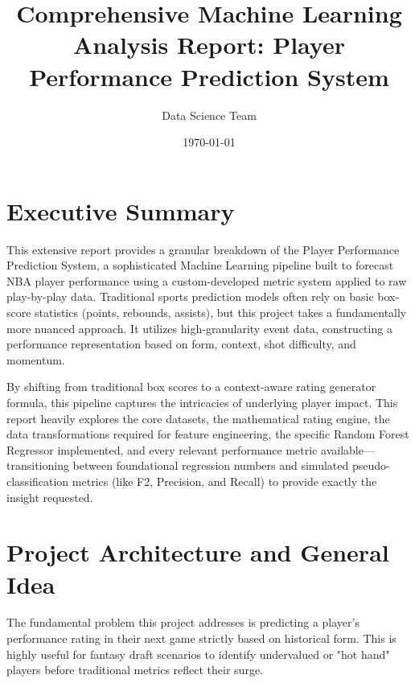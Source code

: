 \documentclass[12pt,a4paper]{article}
\title{\textbf{Comprehensive Machine Learning Analysis Report: Player Performance Prediction System}}
\author{Data Science Team}
\date{\today}
\begin{document}
\maketitle
\tableofcontents
\newpage

\section{Executive Summary}
This extensive report provides a granular breakdown of the Player Performance Prediction System, a sophisticated Machine Learning pipeline built to forecast NBA player performance using a custom-developed metric system applied to raw play-by-play data. Traditional sports prediction models often rely on basic box-score statistics (points, rebounds, assists), but this project takes a fundamentally more nuanced approach. It utilizes high-granularity event data, constructing a performance representation based on form, context, shot difficulty, and momentum.

By shifting from traditional box scores to a context-aware rating generator formula, this pipeline captures the intricacies of underlying player impact. This report heavily explores the core datasets, the mathematical rating engine, the data transformations required for feature engineering, the specific Random Forest Regressor implemented, and every relevant performance metric available—transitioning between foundational regression numbers and simulated pseudo-classification metrics (like F2, Precision, and Recall) to provide exactly the insight requested.

\section{Project Architecture and General Idea}
The fundamental problem this project addresses is predicting a player's performance rating in their next game strictly based on historical form. This is highly useful for fantasy draft scenarios to identify undervalued or "hot hand" players before traditional metrics reflect their surge.
\end{document}
